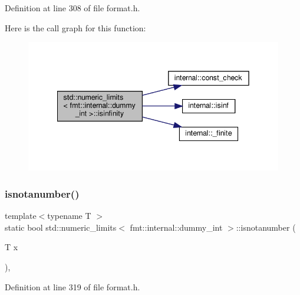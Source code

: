 Definition at line 308 of file format.\+h.

Here is the call graph for this function\+:
\nopagebreak
\begin{figure}[H]
\begin{center}
\leavevmode
\includegraphics[width=342pt]{classstd_1_1numeric__limits_3_01fmt_1_1internal_1_1dummy__int_01_4_ab87acbb0e3b785468702511d2ba20c43_cgraph}
\end{center}
\end{figure}
\mbox{\label{classstd_1_1numeric__limits_3_01fmt_1_1internal_1_1dummy__int_01_4_a66bfe9a9db1167477806c1973002e941}} 
\subsubsection{\texorpdfstring{isnotanumber()}{isnotanumber()}}
{\footnotesize\ttfamily template$<$typename T $>$ \\
static bool std\+::numeric\+\_\+limits$<$ fmt\+::internal\+::dummy\+\_\+int $>$\+::isnotanumber (\begin{DoxyParamCaption}\item[{T}]{x }\end{DoxyParamCaption})\hspace{0.3cm}{\ttfamily [inline]}, {\ttfamily [static]}}



Definition at line 319 of file format.\+h.


